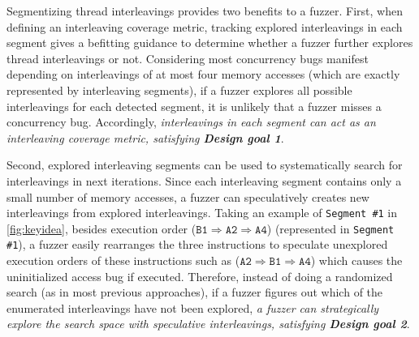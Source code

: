 



%
Segmentizing thread interleavings provides two benefits to a fuzzer.
%
First, when defining an interleaving coverage metric, tracking
explored interleavings in each segment gives a befitting guidance to
determine whether a fuzzer further explores thread interleavings or
not.
%
%
Considering most concurrency bugs manifest depending on interleavings
of at most four memory accesses (which are exactly represented by
interleaving segments), if a fuzzer explores all possible
interleavings for each detected segment, it is unlikely that a fuzzer
misses a concurrency bug.
%
Accordingly, \textit{interleavings in each segment can act as an
  interleaving coverage metric, satisfying \textbf{Design goal 1}}.







Second, explored interleaving segments can be used to systematically
search for interleavings in next iterations.
%
Since each interleaving segment contains only a small number of memory
accesses, a fuzzer can speculatively creates new interleavings
from explored interleavings.
Taking an example of \texttt{Segment \#1} in \autoref{fig:keyidea},
besides execution order
($\texttt{B1} \Rightarrow \texttt{A2} \Rightarrow \texttt{A4}$)
(represented in \texttt{Segment \#1}), a fuzzer easily rearranges
the three instructions to speculate 
unexplored execution orders of these instructions such as
($\texttt{A2} \Rightarrow \texttt{B1} \Rightarrow \texttt{A4}$) which
causes the uninitialized access bug if executed.
Therefore, instead of doing a randomized  search (as in most previous approaches), if a fuzzer figures out which of the enumerated interleavings have not been explored, \textit{a fuzzer can strategically 
explore the search space with speculative interleavings, 
satisfying \textbf{Design goal 2}}.


